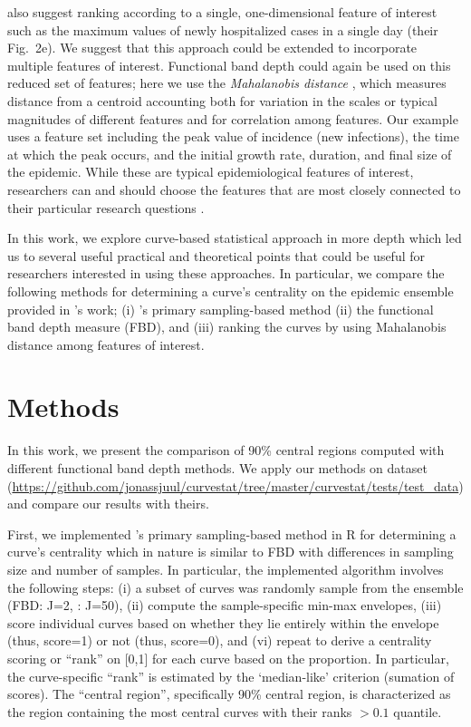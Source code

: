 \documentclass[fleqn,10pt,lineno]{wlpeerj}
\begin{document}
\juul also suggest ranking according to a single, one-dimensional feature of interest such as the maximum values of newly hospitalized cases in a single day (their Fig.~2e). We suggest that this approach could be extended to incorporate multiple features of interest. Functional band depth could again be used on this reduced set of features; here we use the \emph{Mahalanobis distance} \citep{mahalanobis1936generalized}, which measures distance from a centroid accounting both for variation in the scales or typical magnitudes of different features and for correlation among features.
Our example uses a feature set including the peak value of incidence (new infections), the time at which the peak occurs, and the initial growth rate, duration, and final size of the epidemic. While these are typical epidemiological features of interest, researchers can and should choose the features that are most closely connected to their particular research questions \citep{probert2016decision}.

In this work, we explore \juul curve-based statistical approach in more depth which led us to several useful practical and theoretical points that could be useful for researchers interested in using these approaches. In particular, we compare the following methods for determining a curve's centrality on the epidemic ensemble provided in \juul's work; (i) \juul's primary sampling-based method (ii) the functional band depth measure (FBD), and (iii) ranking the curves by using Mahalanobis distance among features of interest.

\section*{Methods}

In this work, we present the comparison of 90\% central regions computed with different functional band depth methods. We apply our methods on \juul dataset (\url{https://github.com/jonassjuul/curvestat/tree/master/curvestat/tests/test_data}) and compare our results with theirs.

First, we implemented \juul's primary sampling-based method in R \citep{R} for determining a curve's centrality which in nature is similar to FBD with differences in sampling size and number of samples. In particular, the implemented algorithm involves the following steps: (i) a subset of curves was randomly sample from the ensemble (FBD: J=2, \juul : J=50), (ii) compute the sample-specific min-max envelopes, (iii) score individual curves based on whether they lie entirely within the envelope (thus, score=1) or not (thus, score=0), and (vi) repeat to derive a centrality scoring or ``rank'' on [0,1] for each curve based on the proportion. In particular, the curve-specific ``rank'' is estimated by the `median-like' criterion (sumation of scores). The ``central region'', specifically 90\% central region, is characterized as the region containing the most central curves with their ranks $> 0.1$ quantile.
\end{document}
